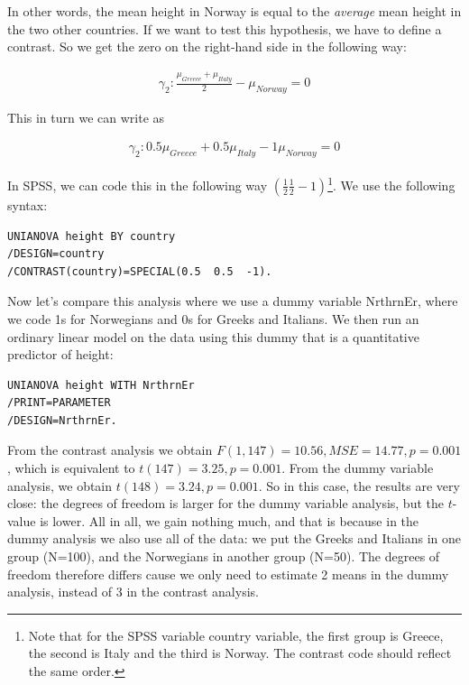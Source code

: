 \documentclass[]{report}\usepackage[]{graphicx}\usepackage[]{color}
\begin{document}
In other words, the mean height in Norway is equal to the \textit{average} mean height in the two other countries. If we want to test this hypothesis, we have to define a contrast. So we get the zero on the right-hand side in the following way:

\begin{eqnarray}
\gamma_2 : \frac{\mu_{Greece} + \mu_{Italy}} {2} - \mu_{Norway}  = 0 
\end{eqnarray}


This in turn we can write as 

\begin{eqnarray}
\gamma_2 : 0.5 \mu_{Greece} + 0.5 \mu_{Italy} - 1 \mu_{Norway}  = 0 
\end{eqnarray}


In SPSS, we can code this in the following way $(\frac{1}{2} \frac{1}{2} -1)$\footnote{Note that for the SPSS variable country variable, the first group is Greece, the second is Italy and the third is Norway. The contrast code should reflect the same order.}. We use the following syntax:

\begin{verbatim}
UNIANOVA height BY country
/DESIGN=country
/CONTRAST(country)=SPECIAL(0.5  0.5  -1).
\end{verbatim}


Now let's compare this analysis where we use a dummy variable NrthrnEr, where we code 1s for Norwegians and 0s for Greeks and Italians. We then run an ordinary linear model on the data using this dummy that is a quantitative predictor of height:


\begin{verbatim}
UNIANOVA height WITH NrthrnEr
/PRINT=PARAMETER
/DESIGN=NrthrnEr.
\end{verbatim}

From the contrast analysis we obtain $F(1,147)=10.56, MSE=14.77, p=0.001$, which is equivalent to $t(147)=3.25, p=0.001$. From the dummy variable analysis, we obtain $t(148)= 3.24, p=0.001$. So in this case, the results are very close: the degrees of freedom is larger for the dummy variable analysis, but the $t$-value is lower. All in all, we gain nothing much, and that is because in the dummy analysis we also use all of the data: we put the Greeks and Italians in one group (N=100), and the Norwegians in another group (N=50). The degrees of freedom therefore differs cause we only need to estimate 2 means in the dummy analysis, instead of 3 in the contrast analysis.
\end{document}
